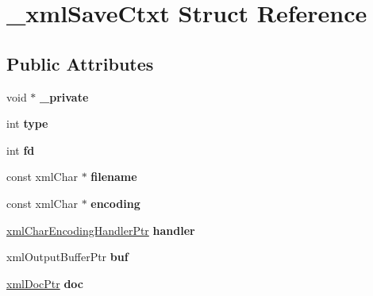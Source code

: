 \hypertarget{struct__xmlSaveCtxt}{
\section{\_\-xmlSaveCtxt Struct Reference}
\label{struct__xmlSaveCtxt}
}
\subsection*{Public Attributes}
\begin{DoxyCompactItemize}
\item 
\hypertarget{struct__xmlSaveCtxt_a1bf9a2b2b480a887c48e2d5a90d27d28}{
void $\ast$ {\bfseries \_\-private}}
\label{struct__xmlSaveCtxt_a1bf9a2b2b480a887c48e2d5a90d27d28}

\item 
\hypertarget{struct__xmlSaveCtxt_a277c07a27be0a3a9744447eae7148a00}{
int {\bfseries type}}
\label{struct__xmlSaveCtxt_a277c07a27be0a3a9744447eae7148a00}

\item 
\hypertarget{struct__xmlSaveCtxt_ad9346f39c76b107ba0d58624a7e3e7fe}{
int {\bfseries fd}}
\label{struct__xmlSaveCtxt_ad9346f39c76b107ba0d58624a7e3e7fe}

\item 
\hypertarget{struct__xmlSaveCtxt_abd0f1280b012e0092bd8c456a9cf3f9a}{
const xmlChar $\ast$ {\bfseries filename}}
\label{struct__xmlSaveCtxt_abd0f1280b012e0092bd8c456a9cf3f9a}

\item 
\hypertarget{struct__xmlSaveCtxt_a7329ebbff5c0747b5a04f55df3e81a41}{
const xmlChar $\ast$ {\bfseries encoding}}
\label{struct__xmlSaveCtxt_a7329ebbff5c0747b5a04f55df3e81a41}

\item 
\hypertarget{struct__xmlSaveCtxt_a3c861976e888140c2f612389bbd794a3}{
\hyperlink{struct__xmlCharEncodingHandler}{xmlCharEncodingHandlerPtr} {\bfseries handler}}
\label{struct__xmlSaveCtxt_a3c861976e888140c2f612389bbd794a3}

\item 
\hypertarget{struct__xmlSaveCtxt_a60b657b68969c310a11296a8378866a0}{
xmlOutputBufferPtr {\bfseries buf}}
\label{struct__xmlSaveCtxt_a60b657b68969c310a11296a8378866a0}

\item 
\hypertarget{struct__xmlSaveCtxt_a7222c7954eee6ab7ed0ed61313c12053}{
\hyperlink{struct__xmlDoc}{xmlDocPtr} {\bfseries doc}}
\label{struct__xmlSaveCtxt_a7222c7954eee6ab7ed0ed61313c12053}


\end{DoxyCompactItemize}
